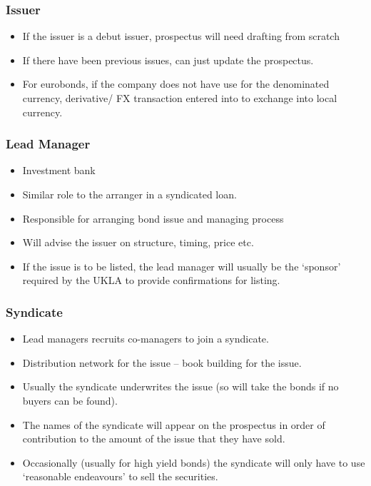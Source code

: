 \documentclass[
]{article}
\providecommand{\tightlist}{%
  \setlength{\itemsep}{0pt}\setlength{\parskip}{0pt}}
\begin{document}
\hypertarget{issuer}{%
\subsubsection{Issuer}\label{issuer}}

\begin{itemize}
\tightlist
\item
  If the issuer is a debut issuer, prospectus will need drafting from
  scratch
\item
  If there have been previous issues, can just update the prospectus.
\item
  For eurobonds, if the company does not have use for the denominated
  currency, derivative/ FX transaction entered into to exchange into
  local currency.
\end{itemize}

\hypertarget{lead-manager}{%
\subsubsection{Lead Manager}\label{lead-manager}}

\begin{itemize}
\tightlist
\item
  Investment bank
\item
  Similar role to the arranger in a syndicated loan.
\item
  Responsible for arranging bond issue and managing process
\item
  Will advise the issuer on structure, timing, price etc.
\item
  If the issue is to be listed, the lead manager will usually be the
  `sponsor' required by the UKLA to provide confirmations for listing.
\end{itemize}

\hypertarget{syndicate}{%
\subsubsection{Syndicate}\label{syndicate}}

\begin{itemize}
\tightlist
\item
  Lead managers recruits co-managers to join a syndicate.
\item
  Distribution network for the issue -- book building for the issue.
\item
  Usually the syndicate underwrites the issue (so will take the bonds if
  no buyers can be found).
\item
  The names of the syndicate will appear on the prospectus in order of
  contribution to the amount of the issue that they have sold.
\item
  Occasionally (usually for high yield bonds) the syndicate will only
  have to use `reasonable endeavours' to sell the securities.
\end{itemize}
\end{document}
